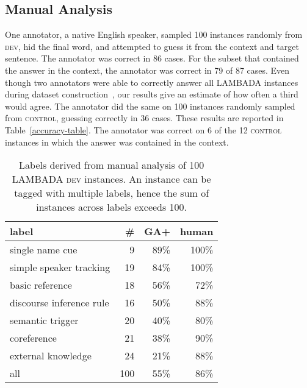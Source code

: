 \documentclass[11pt]{article}
\newcommand{\control}{\textsc{control}\xspace}
\newcommand{\dev}{\textsc{dev}\xspace}
\begin{document}
\subsection{Manual Analysis}

One annotator, a native English speaker, sampled 100 instances randomly from \dev, hid the final word, and attempted to guess it from the context and target sentence. The annotator was correct in 86 cases. For the subset that contained the answer in the context, the annotator was correct in 79 of 87 cases. Even though two annotators were able to correctly answer all LAMBADA instances during dataset construction~\cite{lambada:16}, our results give an estimate of how often a third would agree. 
The annotator did the same on 100 instances randomly sampled from \control, guessing correctly in 36 cases. These results are reported in Table~\ref{accuracy-table}. The annotator was correct on 6 of the 12 \control instances in which the answer was contained in the context. 

\begin{table}[t]
\begin{center}
\begin{tabular}{|lr|r|r|}
\hline 
label & \# & \multicolumn{1}{|c|}{GA+} & \multicolumn{1}{|c|}{human} \\
\hline
single name cue & 9 & 89\% & 100\% \\
simple speaker tracking & 19 & 84\% & 100\%\\
basic reference & 18 & 56\% & 72\% \\
discourse inference rule & 16 & 50\% & 88\% \\
semantic trigger & 20 & 40\% & 80\% \\
coreference & 21 & 38\% & 90\% \\
external knowledge & 24 & 21\% & 88\% \\
\hline
all & 100 & 55\% & 86\% \\
\hline
\end{tabular}
\end{center}
\caption{\label{tab:categories} Labels derived from manual analysis of 100 LAMBADA \dev instances. An instance can be tagged with multiple labels, hence the sum of instances across labels exceeds 100.}
\end{table}
\end{document}
